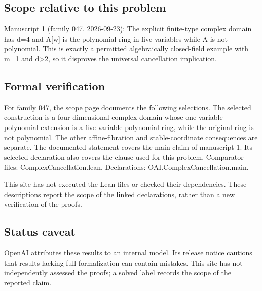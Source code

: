 \documentclass[11pt]{article}
\begin{document}
\subsection{Scope relative to this problem}
Manuscript 1 (family 047, 2026-09-23): The explicit finite-type complex domain has d=4 and A[w] is the polynomial ring in five variables while A is not polynomial. This is exactly a permitted algebraically closed-field example with m=1 and d>2, so it disproves the universal cancellation implication.

\subsection{Formal verification}
For family 047, the scope page documents the following selections. The selected construction is a four-dimensional complex domain whose one-variable polynomial extension is a five-variable polynomial ring, while the original ring is not polynomial. The other affine-fibration and stable-coordinate consequences are separate. The documented statement covers the main claim of manuscript 1. Its selected declaration also covers the clause used for this problem. Comparator files: ComplexCancellation.lean. Declarations: OAI.ComplexCancellation.main.

This site has not executed the Lean files or checked their dependencies. These descriptions report the scope of the linked declarations, rather than a new verification of the proofs.

\subsection{Status caveat}
OpenAI attributes these results to an internal model. Its release notice cautions that results lacking full formalization can contain mistakes. This site has not independently assessed the proofs; a solved label records the scope of the reported claim.
\end{document}
